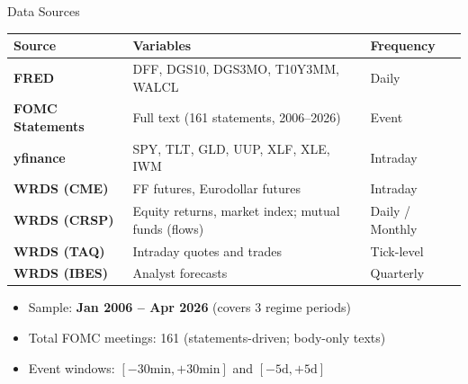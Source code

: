 \documentclass[aspectratio=169, 11pt]{beamer}
\begin{document}
\begin{frame}{Data Sources}
  \centering
  \footnotesize
  \begin{tabularx}{\textwidth}{l X l}
    \toprule
    \textbf{Source} & \textbf{Variables} & \textbf{Frequency} \\
    \midrule
    \textbf{FRED} & DFF, DGS10, DGS3MO, T10Y3MM, WALCL & Daily \\
    \textbf{FOMC Statements} & Full text (161 statements, 2006--2026) & Event \\
    \textbf{yfinance} & SPY, TLT, GLD, UUP, XLF, XLE, IWM & Intraday \\
    \textbf{WRDS (CME)} & FF futures, Eurodollar futures & Intraday \\
    \textbf{WRDS (CRSP)} & Equity returns, market index; mutual funds (flows) & Daily / Monthly \\
    \textbf{WRDS (TAQ)} & Intraday quotes and trades & Tick-level \\
    \textbf{WRDS (IBES)} & Analyst forecasts & Quarterly \\
    \bottomrule
  \end{tabularx}

  \vspace{0.4em}
  \begin{itemize}
    \item<2-> Sample: \textbf{Jan 2006 -- Apr 2026} (covers 3 regime periods)
    \item<3-> Total FOMC meetings: 161 (statements-driven; body-only texts)
    \item<4-> Event windows: $[-30\mathrm{min}, +30\mathrm{min}]$ and $[-5\mathrm{d}, +5\mathrm{d}]$
  \end{itemize}
\end{frame}
\end{document}
